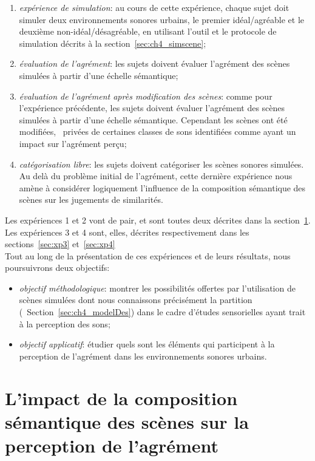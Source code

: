 \begin{enumerate}
\item \emph{expérience de simulation}: au cours de cette expérience, chaque sujet doit simuler deux environnements sonores urbains, le premier idéal/agréable et le deuxième non-idéal/désagréable, en utilisant l'outil et le protocole de simulation décrits à la section~\ref{sec:ch4_simscene};
\item \emph{évaluation de l'agrément}: les sujets doivent évaluer l'agrément des scènes simulées à partir d'une échelle sémantique;
\item \emph{évaluation de l'agrément après modification des scènes}: comme pour l'expérience précédente, les sujets doivent évaluer l'agrément des scènes simulées à partir d'une échelle sémantique. Cependant les scènes ont été modifiées, \ie~privées de certaines classes de sons identifiées comme ayant un impact sur l'agrément perçu; 
\item \emph{catégorisation libre}: les sujets doivent catégoriser les scènes sonores simulées. Au delà du problème initial de l'agrément, cette dernière expérience nous amène à considérer logiquement l'influence de la composition sémantique des scènes sur les jugements de similarités.
\end{enumerate}

Les expériences 1 et 2 vont de pair, et sont toutes deux décrites dans la section~\ref{sec:xp1_2}. Les expériences 3 et 4 sont, elles, décrites respectivement dans les sections~\ref{sec:xp3} et~\ref{sec:xp4}  \\

Tout au long de la présentation de ces expériences et de leurs résultats, nous poursuivrons deux objectifs:

\begin{itemize}
\item \emph{objectif méthodologique}: montrer les possibilités offertes par l'utilisation de scènes simulées dont nous connaissons précisément la partition (\cf~Section~\ref{sec:ch4_modelDes}) dans le cadre d'études sensorielles ayant trait à la perception des sons;
\item \emph{objectif applicatif}: étudier quels sont les éléments qui participent à la perception de l'agrément dans les environnements sonores urbains. 
\end{itemize}

\section[Agrément perçu et composition sémantique]{L'impact de la composition sémantique des scènes sur la perception de l'agrément}
\label{sec:xp1_2}

